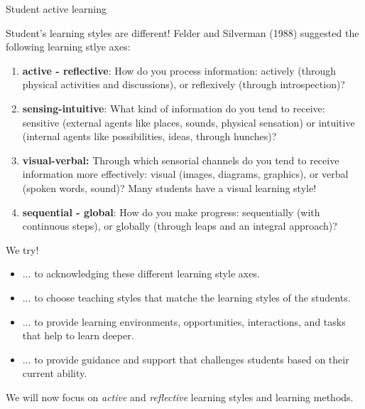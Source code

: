 \documentclass[10pt,ignorenonframetext,]{beamer}
\begin{document}
\begin{frame}{Student active learning}

Student's learning styles are different! Felder and Silverman (1988)
suggested the following learning stlye axes:

\begin{enumerate}
\def\labelenumi{\arabic{enumi})}
\item
  \textbf{active - reflective}: How do you process information: actively
  (through physical activities and discussions), or reflexively (through
  introspection)?
\item
  \textbf{sensing-intuitive}: What kind of information do you tend to
  receive: sensitive (external agents like places, sounds, physical
  sensation) or intuitive (internal agents like possibilities, ideas,
  through hunches)?
\item
  \textbf{visual-verbal:} Through which sensorial channels do you tend
  to receive information more effectively: visual (images, diagrams,
  graphics), or verbal (spoken words, sound)? Many students have a
  visual learning style!
\item
  \textbf{sequential - global}: How do you make progress: sequentially
  (with continuous steps), or globally (through leaps and an integral
  approach)?
\end{enumerate}

\end{frame}

\begin{frame}

\begin{block}{We try!}

\vspace{2mm}

\begin{itemize}
\item
  \(\ldots\) to acknowledging these different learning style axes.
\item
  \(\ldots\) to choose teaching styles that matche the learning styles
  of the students.
\end{itemize}

\vspace{-3mm}

\begin{itemize}
\item
  \(\ldots\) to provide learning environments, opportunities,
  interactions, and tasks that help to learn deeper.
\item
  \(\ldots\) to provide guidance and support that challenges students
  based on their current ability.
\end{itemize}

We will now focus on \emph{active} and \emph{reflective} learning styles
and learning methods.

\end{block}

\end{frame}
\end{document}

